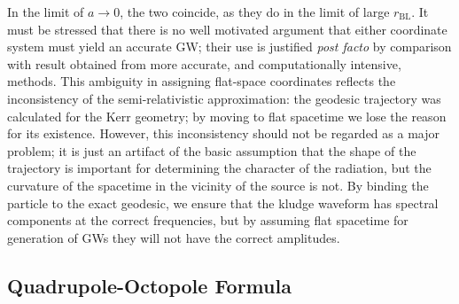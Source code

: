 \documentclass[a4paper, 11pt, titlepage, twoside]{report}
\newcommand{\sub}[1]{\ensuremath{_\mathrm{#1}}}
\begin{document}
{In the limit of $a \rightarrow 0$, the two coincide, as they do in the limit of large $r\sub{BL}$. It must be stressed that there is no well motivated argument that either coordinate system must yield an accurate GW; their use is justified {\it post facto} by comparison with result obtained from more accurate, and computationally intensive, methods\cite{Gair2005, Babak2007}. This ambiguity in assigning flat-space coordinates reflects the inconsistency of the semi-relativistic approximation: the geodesic trajectory was calculated for the Kerr geometry; by moving to flat spacetime we lose the reason for its existence. However, this inconsistency should not be regarded as a major problem; it is just an artifact of the basic assumption that the shape of the trajectory is important for determining the character of the radiation, but the curvature of the spacetime in the vicinity of the source is not. By binding the particle to the exact geodesic, we ensure that the kludge waveform has spectral components at the correct frequencies, but by assuming flat spacetime for generation of GWs they will not have the correct amplitudes.

\subsection{Quadrupole-Octopole Formula}

}
\end{document}
